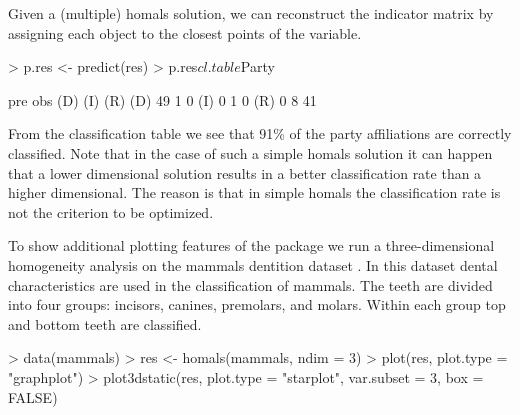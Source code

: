 \documentclass[article]{Z}
\begin{document}
Given a (multiple) homals solution, we can reconstruct the indicator matrix by assigning each object to the closest points of the variable.

\begin{Schunk}
\begin{Sinput}
> p.res <- predict(res)
> p.res$cl.table$Party
\end{Sinput}
\begin{Soutput}
     pre
obs   (D) (I) (R)
  (D)  49   1   0
  (I)   0   1   0
  (R)   0   8  41
\end{Soutput}
\end{Schunk}

From the classification table we see that 91\% of the party affiliations are correctly classified. Note that in the case of such a simple homals solution it can happen that a lower dimensional solution results in a better classification rate than a higher dimensional. The reason is that in simple homals the classification rate is not the criterion to be optimized. 

To show additional plotting features of the  package we run a three-dimensional homogeneity analysis on the mammals dentition dataset \citep{Hartigan:75}. In this dataset dental characteristics are used in the classification of mammals. The teeth are divided into four groups: incisors, canines, premolars, and molars. Within each group top and bottom teeth are classified. 

\begin{Schunk}
\begin{Sinput}
> data(mammals)
> res <- homals(mammals, ndim = 3)
> plot(res, plot.type = "graphplot")
> plot3dstatic(res, plot.type = "starplot", var.subset = 3, box = FALSE)
\end{Sinput}
\end{Schunk}
\end{document}
